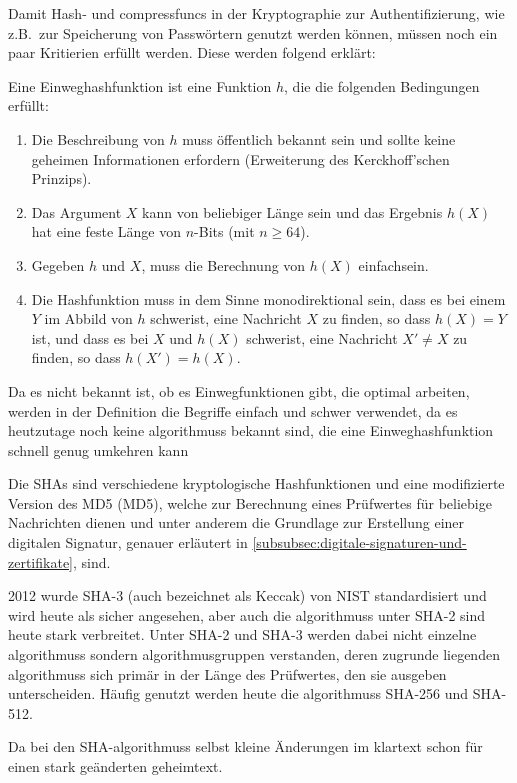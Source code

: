 Damit Hash- und \glspl{compressfunc} in der Kryptographie zur Authentifizierung, wie z.B.\ zur Speicherung von Passwörtern genutzt werden können, müssen noch ein paar Kritierien erfüllt werden.
Diese werden folgend erklärt:

\begin{definition}
    Eine Einweghashfunktion ist eine Funktion $h$, die die folgenden Bedingungen erfüllt\autocite[\pagef~17]{anal_des_hash_function_2003}:
    \begin{enumerate}
        \item Die Beschreibung von $h$ muss öffentlich bekannt sein und sollte keine geheimen Informationen erfordern (Erweiterung des Kerckhoff'schen Prinzips\autocite[]{petitcolas_information_nodate}).
        \item Das Argument $X$ kann von beliebiger Länge sein und das Ergebnis $h(X)$ hat eine feste Länge von $n$-Bits (mit $n \geq64$).
        \item Gegeben $h$ und $X$, muss die Berechnung von $h(X)$ einfach\footnotemark sein.
        \item Die Hashfunktion muss in dem Sinne monodirektional sein, dass es bei einem $Y$ im Abbild von $h$ schwer\footnotemark[\value{footnote}] ist, eine Nachricht $X$ zu finden, so dass $h(X)=Y$ ist, und dass es bei $X$ und $h(X)$ schwer\footnotemark[\value{footnote}] ist, eine Nachricht $X'\neq X$ zu finden, so dass $h(X') = h(X)$.
    \end{enumerate}
\end{definition}

Da es nicht bekannt ist, ob es Einwegfunktionen gibt, die optimal arbeiten, werden in der Definition die Begriffe einfach und schwer verwendet, da es heutzutage noch keine \glspl{algorithmus} bekannt sind, die eine Einweghashfunktion schnell genug umkehren kann\autocite[\pagef~234]{buchmann_einfuhrung_2016}

Die \acfp{SHA} sind verschiedene kryptologische Hashfunktionen und eine modifizierte Version des \gls{MD5} (\acs{MD5}), welche zur Berechnung eines Prüfwertes für beliebige Nachrichten dienen und unter anderem die Grundlage zur Erstellung einer digitalen Signatur, genauer erläutert in \autoref{subsubsec:digitale-signaturen-und-zertifikate}, sind\autocite[]{WhatisSH81:online}.

2012 wurde \ac{SHA}-3 (auch bezeichnet als Keccak) von \ac{NIST} standardisiert und wird heute als sicher angesehen\autocite[\pagef~239]{buchmann_einfuhrung_2016}, aber auch die \glspl{algorithmus} unter \ac{SHA}-2 sind heute stark verbreitet.
Unter \ac{SHA}-2 und \ac{SHA}-3 werden dabei nicht einzelne \glspl{algorithmus} sondern \gls{algorithmus}gruppen verstanden, deren zugrunde liegenden \glspl{algorithmus} sich primär in der Länge des Prüfwertes, den sie ausgeben unterscheiden.
Häufig genutzt werden heute die \glspl{algorithmus} \ac{SHA}-256 und \ac{SHA}-512.

Da bei den \ac{SHA}-\glspl{algorithmus} selbst kleine Änderungen im \gls{klartext} schon für einen stark geänderten \gls{geheimtext}.
